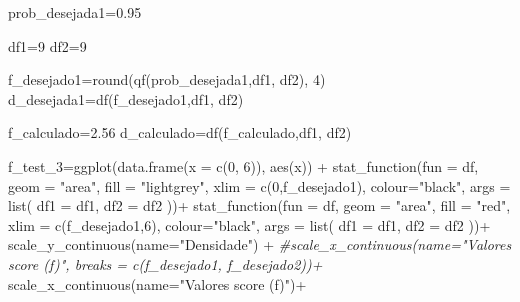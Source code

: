\documentclass[
]{book}
\newenvironment{Shaded}{\begin{snugshade}}{\end{snugshade}}
\newcommand{\AttributeTok}[1]{\textcolor[rgb]{0.77,0.63,0.00}{#1}}
\newcommand{\CommentTok}[1]{\textcolor[rgb]{0.56,0.35,0.01}{\textit{#1}}}
\newcommand{\DecValTok}[1]{\textcolor[rgb]{0.00,0.00,0.81}{#1}}
\newcommand{\FloatTok}[1]{\textcolor[rgb]{0.00,0.00,0.81}{#1}}
\newcommand{\FunctionTok}[1]{\textcolor[rgb]{0.00,0.00,0.00}{#1}}
\newcommand{\NormalTok}[1]{#1}
\newcommand{\OtherTok}[1]{\textcolor[rgb]{0.56,0.35,0.01}{#1}}
\newcommand{\SpecialCharTok}[1]{\textcolor[rgb]{0.00,0.00,0.00}{#1}}
\newcommand{\StringTok}[1]{\textcolor[rgb]{0.31,0.60,0.02}{#1}}
\begin{document}
\begin{Shaded}
\begin{Highlighting}[]
\NormalTok{prob\_desejada1}\OtherTok{=}\FloatTok{0.95}

\NormalTok{df1}\OtherTok{=}\DecValTok{9}
\NormalTok{df2}\OtherTok{=}\DecValTok{9}  

\NormalTok{f\_desejado1}\OtherTok{=}\FunctionTok{round}\NormalTok{(}\FunctionTok{qf}\NormalTok{(prob\_desejada1,df1, df2), }\DecValTok{4}\NormalTok{)}
\NormalTok{d\_desejada1}\OtherTok{=}\FunctionTok{df}\NormalTok{(f\_desejado1,df1, df2)}

\NormalTok{f\_calculado}\OtherTok{=}\FloatTok{2.56}
\NormalTok{d\_calculado}\OtherTok{=}\FunctionTok{df}\NormalTok{(f\_calculado,df1, df2)}

\NormalTok{f\_test\_3}\OtherTok{=}\FunctionTok{ggplot}\NormalTok{(}\FunctionTok{data.frame}\NormalTok{(}\AttributeTok{x =} \FunctionTok{c}\NormalTok{(}\DecValTok{0}\NormalTok{, }\DecValTok{6}\NormalTok{)), }\FunctionTok{aes}\NormalTok{(x)) }\SpecialCharTok{+}
  \FunctionTok{stat\_function}\NormalTok{(}\AttributeTok{fun =}\NormalTok{ df,}
                \AttributeTok{geom =} \StringTok{"area"}\NormalTok{,}
                \AttributeTok{fill =} \StringTok{"lightgrey"}\NormalTok{,}
                \AttributeTok{xlim =} \FunctionTok{c}\NormalTok{(}\DecValTok{0}\NormalTok{,f\_desejado1),}
                \AttributeTok{colour=}\StringTok{"black"}\NormalTok{,}
                \AttributeTok{args =} \FunctionTok{list}\NormalTok{(}
                  \AttributeTok{df1 =}\NormalTok{ df1,}
                  \AttributeTok{df2 =}\NormalTok{ df2}
\NormalTok{                ))}\SpecialCharTok{+}
  \FunctionTok{stat\_function}\NormalTok{(}\AttributeTok{fun =}\NormalTok{ df,}
                \AttributeTok{geom =} \StringTok{"area"}\NormalTok{,}
                \AttributeTok{fill =} \StringTok{"red"}\NormalTok{,}
                \AttributeTok{xlim =} \FunctionTok{c}\NormalTok{(f\_desejado1,}\DecValTok{6}\NormalTok{),}
                \AttributeTok{colour=}\StringTok{"black"}\NormalTok{,}
                \AttributeTok{args =} \FunctionTok{list}\NormalTok{(}
                  \AttributeTok{df1 =}\NormalTok{ df1,}
                  \AttributeTok{df2 =}\NormalTok{ df2}
\NormalTok{                ))}\SpecialCharTok{+}
  \FunctionTok{scale\_y\_continuous}\NormalTok{(}\AttributeTok{name=}\StringTok{"Densidade"}\NormalTok{) }\SpecialCharTok{+}
  \CommentTok{\#scale\_x\_continuous(name="Valores score (f)", breaks = c(f\_desejado1, f\_desejado2))+  }
  \FunctionTok{scale\_x\_continuous}\NormalTok{(}\AttributeTok{name=}\StringTok{"Valores score (f)"}\NormalTok{)}\SpecialCharTok{+}  

\end{Highlighting}
\end{Shaded}
\end{document}

